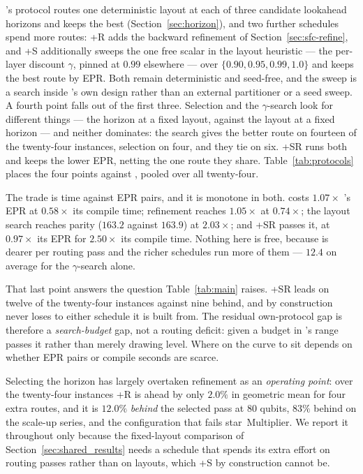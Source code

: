 \PORTER{}'s protocol routes one deterministic layout at each of three
candidate lookahead horizons and keeps the best
(Section~\ref{sec:horizon}), and two further schedules spend more
routes: \PORTER{}+R adds the backward refinement of
Section~\ref{sec:sfc-refine}, and \PORTER{}+S additionally sweeps the
one free scalar in the layout heuristic --- the per-layer discount
$\gamma$, pinned at $0.99$ elsewhere --- over $\{0.90,0.95,0.99,1.0\}$
and keeps the best route by EPR. Both remain deterministic and
seed-free, and the sweep is a search inside \PORTER{}'s own design
rather than an external partitioner or a seed sweep.
A fourth point falls out of the first three. Selection and the
$\gamma$-search look for different things --- the horizon at a fixed
layout, against the layout at a fixed horizon --- and neither dominates:
the search gives the better route on fourteen of the twenty-four
instances, selection on four, and they tie on six. \PORTER{}+SR runs both and keeps the lower EPR,
netting the one route they share. Table~\ref{tab:protocols} places the
four points against \dSABRE{}, pooled over all twenty-four.

The trade is time against EPR pairs, and it is monotone in both.
\PORTER{} costs $1.07\times$ \dSABRE{}'s EPR at $0.58\times$ its compile
time; refinement reaches $1.05\times$ at $0.74\times$; the layout search
reaches parity ($163.2$ against $163.9$) at $2.03\times$; and
\PORTER{}+SR passes it, at $0.97\times$ its EPR for $2.50\times$ its
compile time. Nothing here is free, because \PORTER{} is dearer per
routing pass and the richer schedules run more of them --- $12.4$ on
average for the $\gamma$-search alone.

That last point answers the question Table~\ref{tab:main} raises.
\PORTER{}+SR leads \dSABRE{} on twelve of the twenty-four instances
against nine behind, and by construction never loses to either schedule
it is built from. The residual own-protocol gap is therefore a
\emph{search-budget} gap, not a routing deficit: given a budget in
\dSABRE{}'s range \PORTER{} passes it rather than merely drawing level.
Where on the curve to sit depends on whether EPR pairs or compile
seconds are scarce.

Selecting the horizon has largely overtaken refinement as an
\emph{operating point}: over the twenty-four instances \PORTER{}+R is
ahead by only $2.0\%$ in geometric mean for four extra routes, and it is
$12.0\%$ \emph{behind} the selected pass at 80 qubits, $83\%$ behind on
the scale-up series, and the configuration that fails star~Multiplier.
We report it throughout only because the fixed-layout comparison of
Section~\ref{sec:shared_results} needs a \PORTER{} schedule that spends
its extra effort on routing passes rather than on layouts, which
\PORTER{}+S by construction cannot be.

